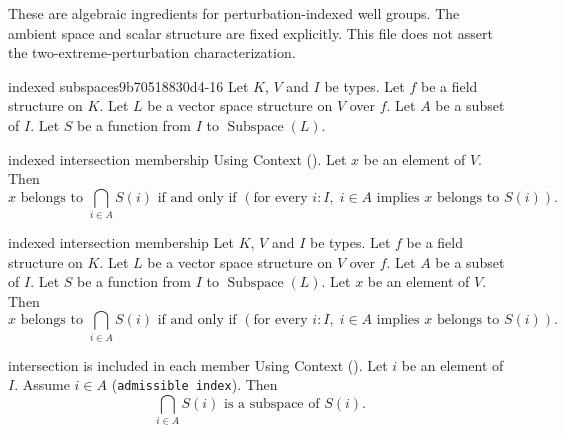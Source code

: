 These are algebraic ingredients for perturbation-indexed well groups.
The ambient space and scalar structure are fixed explicitly.
This file does not assert the two-extreme-perturbation characterization.
\par

\ifcleanreferenced
\begin{cleancontext}{indexed subspaces}{9b70518830d4-16}
Let $K$, $V$ and $I$ be types.
Let $f$ be a field structure on $K$.
Let $L$ be a vector space structure on $V$ over $f$.
Let $A$ be a subset of $I$.
Let $S$ be a function from $I$ to $\operatorname{Subspace}(L)$.
\end{cleancontext}
\begin{cleanresult}{indexed intersection membership}
Using Context ().
Let $x$ be an element of $V$.
Then \[x\text{ belongs to }\bigcap_{i \in A} S(i)\text{ if and only if }\left(\text{for every }i : I,\; i\in A\text{ implies }x\text{ belongs to }S(i)\right).\]
\par{}
\end{cleanresult}

\else
\begin{cleanresult}{indexed intersection membership}
Let $K$, $V$ and $I$ be types.
Let $f$ be a field structure on $K$.
Let $L$ be a vector space structure on $V$ over $f$.
Let $A$ be a subset of $I$.
Let $S$ be a function from $I$ to $\operatorname{Subspace}(L)$.
Let $x$ be an element of $V$.
Then \[x\text{ belongs to }\bigcap_{i \in A} S(i)\text{ if and only if }\left(\text{for every }i : I,\; i\in A\text{ implies }x\text{ belongs to }S(i)\right).\]
\par{}
\end{cleanresult}

\fi
\ifcleanreferenced
\begin{cleanresult}{intersection is included in each member}
Using Context ().
Let $i$ be an element of $I$.
Assume $i\in A$ (\texttt{admissible index}).
Then \[\bigcap_{i \in A} S(i)\text{ is a subspace of }S(i).\]
\par{}
\end{cleanresult}

